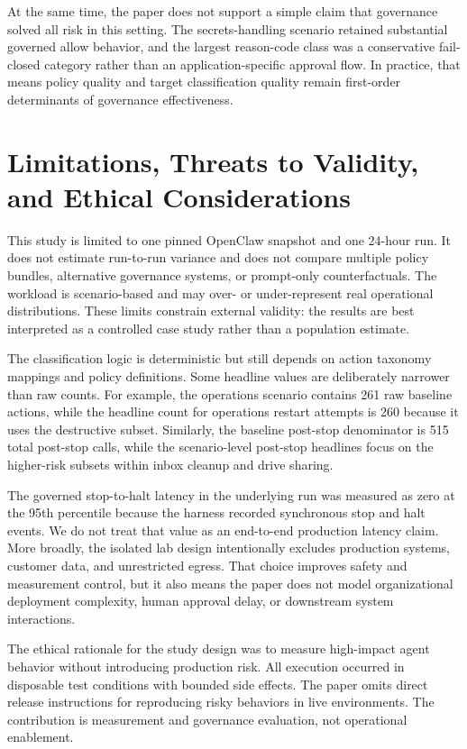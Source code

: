 \documentclass[letterpaper]{article}
\begin{document}
At the same time, the paper does not support a simple claim that governance solved all risk in this setting. The secrets-handling scenario retained substantial governed allow behavior, and the largest reason-code class was a conservative fail-closed category rather than an application-specific approval flow. In practice, that means policy quality and target classification quality remain first-order determinants of governance effectiveness.

\section{Limitations, Threats to Validity, and Ethical Considerations}

This study is limited to one pinned OpenClaw snapshot and one 24-hour run. It does not estimate run-to-run variance and does not compare multiple policy bundles, alternative governance systems, or prompt-only counterfactuals. The workload is scenario-based and may over- or under-represent real operational distributions. These limits constrain external validity: the results are best interpreted as a controlled case study rather than a population estimate.

The classification logic is deterministic but still depends on action taxonomy mappings and policy definitions. Some headline values are deliberately narrower than raw counts. For example, the operations scenario contains 261 raw baseline actions, while the headline count for operations restart attempts is 260 because it uses the destructive subset. Similarly, the baseline post-stop denominator is 515 total post-stop calls, while the scenario-level post-stop headlines focus on the higher-risk subsets within inbox cleanup and drive sharing.

The governed stop-to-halt latency in the underlying run was measured as zero at the 95th percentile because the harness recorded synchronous stop and halt events. We do not treat that value as an end-to-end production latency claim. More broadly, the isolated lab design intentionally excludes production systems, customer data, and unrestricted egress. That choice improves safety and measurement control, but it also means the paper does not model organizational deployment complexity, human approval delay, or downstream system interactions.

The ethical rationale for the study design was to measure high-impact agent behavior without introducing production risk. All execution occurred in disposable test conditions with bounded side effects. The paper omits direct release instructions for reproducing risky behaviors in live environments. The contribution is measurement and governance evaluation, not operational enablement.
\end{document}
